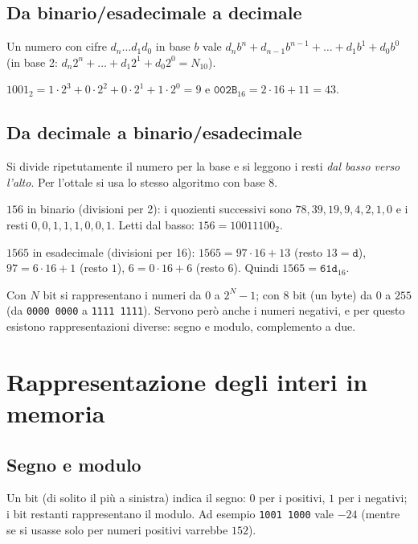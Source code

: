 \documentclass[11pt,a4paper]{article}
\begin{document}
\subsection{Da binario/esadecimale a decimale}

Un numero con cifre $d_n \dots d_1 d_0$ in base $b$ vale
$d_n b^n + d_{n-1} b^{n-1} + \dots + d_1 b^1 + d_0 b^0$ (in base 2:
$d_n 2^n + \dots + d_1 2^1 + d_0 2^0 = N_{10}$).

\begin{esempio}
$1001_2 = 1 \cdot 2^3 + 0 \cdot 2^2 + 0 \cdot 2^1 + 1 \cdot 2^0 = 9$ \quad e \quad
$\texttt{002B}_{16} = 2 \cdot 16 + 11 = 43$.
\end{esempio}

\subsection{Da decimale a binario/esadecimale}

Si divide ripetutamente il numero per la base e si leggono i resti
\emph{dal basso verso l'alto}. Per l'ottale si usa lo stesso algoritmo con base 8.

\begin{esempio}
$156$ in binario (divisioni per 2): i quozienti successivi sono
$78, 39, 19, 9, 4, 2, 1, 0$ e i resti $0, 0, 1, 1, 1, 0, 0, 1$. Letti dal basso:
$156 = 10011100_2$.

$1565$ in esadecimale (divisioni per 16): $1565 = 97 \cdot 16 + 13$ (resto
$13 = \texttt{d}$), $97 = 6 \cdot 16 + 1$ (resto $1$), $6 = 0 \cdot 16 + 6$
(resto $6$). Quindi $1565 = \texttt{61d}_{16}$.
\end{esempio}

Con $N$ bit si rappresentano i numeri da $0$ a $2^N - 1$; con 8 bit (un byte)
da $0$ a $255$ (da \texttt{0000 0000} a \texttt{1111 1111}). Servono però anche i
numeri negativi, e per questo esistono rappresentazioni diverse: segno e modulo,
complemento a due.

\section{Rappresentazione degli interi in memoria}

\subsection{Segno e modulo}

Un bit (di solito il più a sinistra) indica il segno: $0$ per i positivi, $1$ per
i negativi; i bit restanti rappresentano il modulo. Ad esempio \texttt{1001 1000}
vale $-24$ (mentre se si usasse solo per numeri positivi varrebbe $152$).
\end{document}
